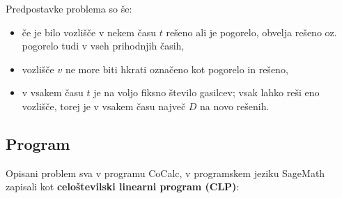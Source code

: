 \documentclass[a4paper, 12pt]{article}
\begin{document}
\noindent Predpostavke problema so še: 
\begin{itemize}
    \item če je bilo vozlišče v nekem času $t$ rešeno ali je pogorelo, obvelja rešeno oz. pogorelo tudi v 
    vseh prihodnjih časih,
    \item vozlišče $v$ ne more biti hkrati označeno kot pogorelo in rešeno,
    \item v vsakem času $t$ je na voljo fiksno število gasilcev; vsak lahko reši
    eno vozlišče, torej je v vsakem času največ $D$ na novo rešenih.
\end{itemize}

\subsection{Program}

\noindent Opisani problem sva v programu CoCalc, v programskem jeziku SageMath 
zapisali kot \textbf{celoštevilski linearni program (CLP)}: \\
\end{document}
